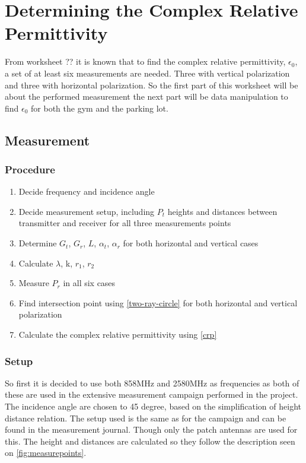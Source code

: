 \chapter{Determining the Complex Relative Permittivity}


From worksheet ?? it is known that to find the complex relative permittivity, $\epsilon_0$, a set of at least six measurements are needed. Three with vertical polarization and three with horizontal polarization. So the first part of this worksheet will be about the performed measurement the next part will be data manipulation to find $\epsilon_0$ for both the gym and the parking lot.

\section{Measurement}
\subsection{Procedure}
\begin{enumerate}
	\item Decide frequency and incidence angle
	\item Decide measurement setup, including $P_t$ heights and distances between transmitter and receiver for all three measurements points
	\item Determine $G_t$, $G_r$, $L$, $\alpha_t$, $\alpha_r$ for both horizontal and vertical cases
	\item Calculate $\lambda$, k, $r_1$, $r_2$
	\item Measure $P_r$ in all six cases
	\item Find intersection point using \autoref{two-ray-circle} for both horizontal and vertical polarization
	\item Calculate the complex relative permittivity using \autoref{crp}
\end{enumerate}

\subsection{Setup}
So first it is decided to use both 858MHz and 2580MHz as frequencies as both of these are used in the extensive measurement campaign performed in the project. The incidence angle are chosen to 45 degree, based on the simplification of height distance relation. 
The setup used is the same as for the campaign and can be found in the measurement journal. Though only the patch antennas are used for this. The height and distances are calculated so they follow the description seen on \autoref{fig:measurepoints}. 

